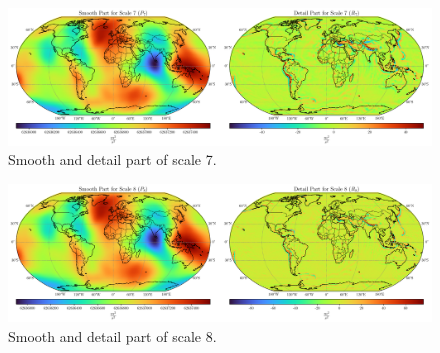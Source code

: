 \documentclass[12pt]{article}
\begin{document}
	\clearpage
	
	\begin{figure}[h!]
		\centering
		\includegraphics[width=16cm]{../Outputs/Plots/Outputs_Scale7.pdf}
		\caption{Smooth and detail part of scale 7.}
		\label{fig:Results7}
	\end{figure}
	
	\begin{figure}[h!]
		\centering
		\includegraphics[width=16cm]{../Outputs/Plots/Outputs_Scale8.pdf}
		\caption{Smooth and detail part of scale 8.}
		\label{fig:Results8}
	\end{figure}
	
	
	
\end{document}
